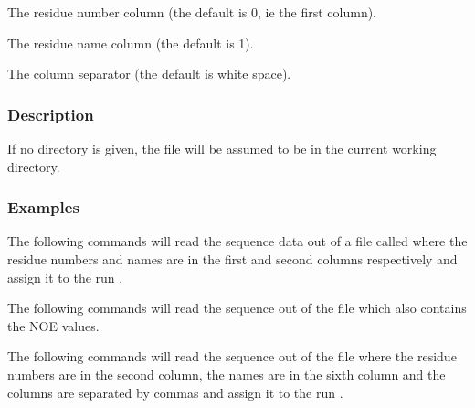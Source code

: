   The residue number column (the default is 0, ie the first column). 

  The residue name column (the default is 1). 

  The column separator (the default is white space). 




\subsubsection{Description}

If no directory is given, the file will be assumed to be in the current working directory.



\subsubsection{Examples}

The following commands will read the sequence data out of a file called  where the residue numbers and names are in the first and second columns respectively and assign it to the run .





The following commands will read the sequence out of the file  which also contains the NOE values.





The following commands will read the sequence out of the file  where the residue numbers are in the second column, the names are in the sixth column and the columns are separated by commas and assign it to the run .






